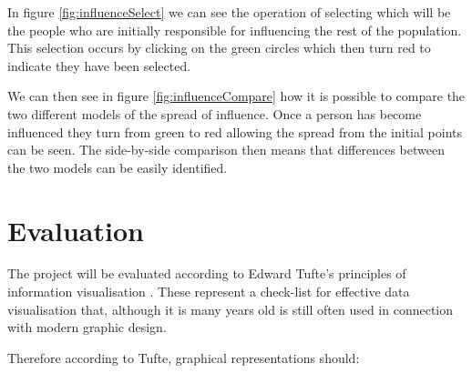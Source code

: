 \documentclass[12pt,a4paper]{article}
\begin{document}
In figure \ref{fig:influenceSelect} we can see the operation of selecting which will be the people who are initially responsible for influencing the rest of the population. This selection occurs by clicking on the green circles which then turn red to indicate they have been selected.

We can then see in figure \ref{fig:influenceCompare} how it is possible to compare the two different models of the spread of influence. Once a person has become influenced they turn from green to red allowing the spread from the initial points can be seen. The side-by-side comparison then means that differences between the two models can be easily identified.

\section{Evaluation}
\noindent
The project will be evaluated according to Edward Tufte's principles of information visualisation \cite{tufte1983visual}. These represent a check-list for effective data visualisation that, although it is many years old is still often used in connection with modern graphic design.

Therefore according to Tufte, graphical representations should:
\end{document}
